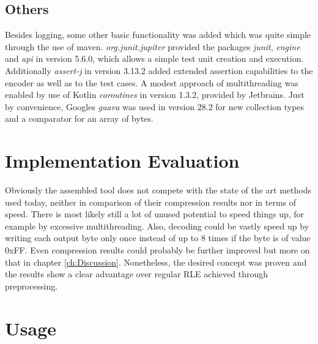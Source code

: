 \subsection{Others}
\label{ch:Implementation:sec:Impl:subsec:libs:others}
\par{
Besides logging, some other basic functionality was added which was quite simple through the use of maven. \emph{org.junit.jupiter} provided the packages \emph{junit}, \emph{engine} and \emph{api} in version 5.6.0, which allows a simple test unit creation and execution. Additionally \emph{assert-j} in version 3.13.2 added extended assertion capabilities to the encoder as well as to the test cases. A modest approach of multithreading was enabled by use of Kotlin \emph{coroutines} in version 1.3.2, provided by Jetbrains. Just by convenience, Googles \emph{guava} was used in version 28.2 for new collection types and a comparator for an array of bytes.
}


\section{Implementation Evaluation}
\label{ch:Implementation:sec:Implementation Evaluation}
\par{
Obviously the assembled tool does not compete with the state of the art methods used today, neither in comparison of their compression results nor in terms of speed. There is most likely still a lot of unused potential to speed things up, for example by excessive multithreading. Also, decoding could be vastly speed up by writing each output byte only once instead of up to 8 times if the byte is of value 0xFF. Even compression results could probably be further improved but more on that in chapter \ref{ch:Discussion}. Nonetheless, the desired concept was proven and the results show a clear advantage over regular RLE achieved through preprocessing. 
}

\section{Usage}
\label{ch:Implementation:sec:usage}
\par{

}

